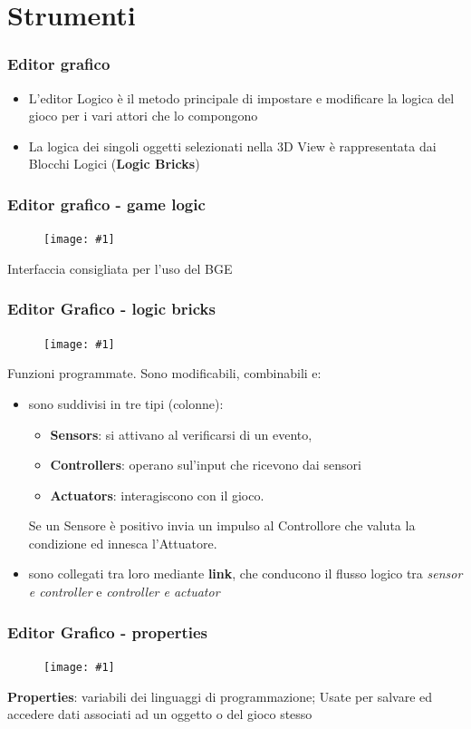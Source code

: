 \documentclass{beamer}
\def\image[#1][#2]{
	\begin{figure}[H]
		\centering
		\texttt{[image: \#1]}
\end{figure}}
\begin{document}
	\section{Strumenti}
		\begin{frame}
			\frametitle{Editor grafico}
			\begin{itemize}
				\item L'editor Logico è il metodo principale di impostare e modificare la logica del gioco per i vari attori che lo compongono
				\item La logica dei singoli oggetti selezionati nella 3D View è rappresentata dai Blocchi Logici (\textbf{Logic Bricks})
			\end{itemize}
		\end{frame}
		\begin{frame}
			\frametitle{Editor grafico - game logic}
			\image[images/gamegui.png][scale=0.16]
			Interfaccia consigliata per l'uso del BGE
		\end{frame}
		\begin{frame}
			\frametitle{Editor Grafico - logic bricks}
			\image[images/logic_bricks.png][scale=0.27]
			Funzioni programmate. Sono modificabili, combinabili e:
				\begin{itemize}
					\item sono suddivisi in tre tipi (colonne): 
					\begin{itemize}
						\item\textbf{Sensors}: \footnotesize si attivano al verificarsi di un evento, 
						\item \textbf{Controllers}: \footnotesize operano sul'input che ricevono dai sensori
						\item \textbf{Actuators}: \footnotesize interagiscono con il gioco.
					\end{itemize}
						Se un Sensore è positivo invia un impulso al Controllore che valuta la condizione ed innesca l’Attuatore.
						\item sono collegati tra loro mediante \textbf{link}, che conducono il flusso logico tra \textit{sensor e controller} e \textit{controller e actuator}
					\end{itemize}
		\end{frame}
		\begin{frame}
			\frametitle{Editor Grafico - properties}
			\image[images/props.png][scale=0.4]
			\textbf{Properties}: variabili dei linguaggi di programmazione; Usate per salvare ed accedere dati associati ad un oggetto o del gioco stesso
		\end{frame}
\end{document}
